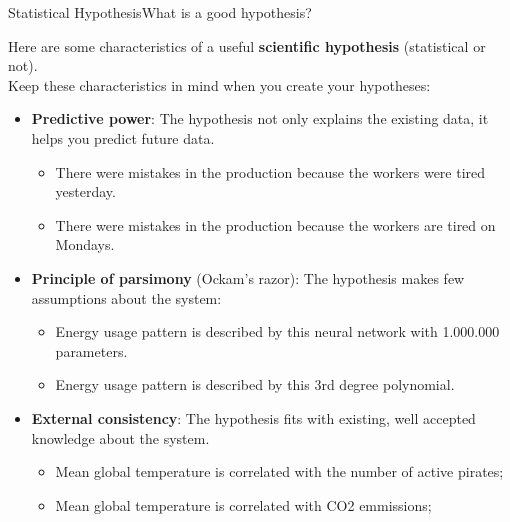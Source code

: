 \begin{frame}{Statistical Hypothesis}{What is a good hypothesis?}

  Here are some characteristics of a useful {\bf scientific hypothesis} (statistical or not).\\
  Keep these characteristics in mind when you create your hypotheses:\bigskip

  \begin{itemize}
    \item {\bf Predictive power}: The hypothesis not only explains the existing data, it helps you predict future data.
    \begin{itemize}
      \item There were mistakes in the production because the workers were tired yesterday.
      \item There were mistakes in the production because the workers are tired on Mondays.
    \end{itemize}

    \item {\bf Principle of parsimony} (Ockam's razor): The hypothesis makes few assumptions about the system:
    \begin{itemize}
      \item Energy usage pattern is described by this neural network with 1.000.000 parameters.
      \item Energy usage pattern is described by this 3rd degree polynomial.
    \end{itemize}

    \item {\bf External consistency}: The hypothesis fits with existing, well accepted knowledge about the system.
    \begin{itemize}
      \item Mean global temperature is correlated with the number of active pirates;
      \item Mean global temperature is correlated with CO2 emmissions;
    \end{itemize}
  \end{itemize}
\end{frame}

